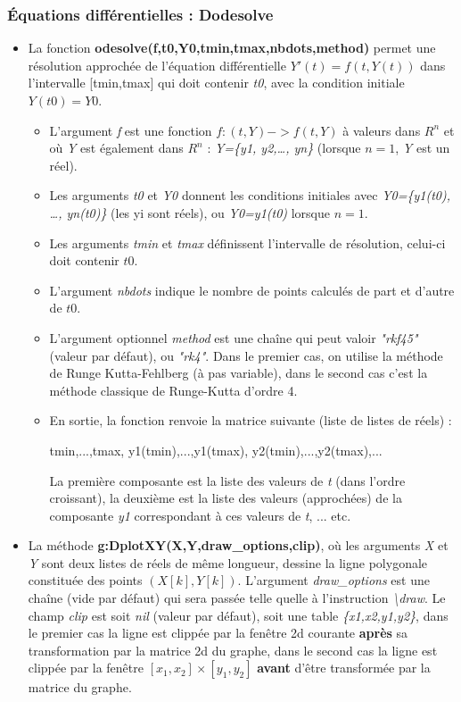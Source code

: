 \subsubsection{Équations différentielles : Dodesolve}

\begin{itemize}
\item La fonction \textbf{odesolve(f,t0,Y0,tmin,tmax,nbdots,method)} permet une résolution approchée de l'équation différentielle \(Y'(t)=f(t,Y(t))\) dans l'intervalle {[}tmin,tmax{]} qui doit contenir \emph{t0}, avec la condition initiale $Y(t0)=Y0$.

\begin{itemize}
  \item L'argument \emph{f} est une fonction \(f: (t,Y) -> f(t,Y)\) à valeurs dans \(R^n\) et où \emph{Y} est également dans \(R^n\) : \emph{Y=\{y1, y2,\ldots, yn\}} (lorsque $n=1$, \emph{Y} est un réel).
  \item Les arguments \emph{t0} et \emph{Y0} donnent les conditions initiales avec \emph{Y0=\{y1(t0), \ldots, yn(t0)\}} (les yi sont réels), ou \emph{Y0=y1(t0)} lorsque $n=1$.
  \item Les arguments \emph{tmin} et \emph{tmax} définissent l'intervalle de résolution, celui-ci doit contenir \(t0\).
  \item L'argument \emph{nbdots} indique le nombre de points calculés de part et d'autre de \(t0\).
  \item L'argument optionnel \emph{method} est une chaîne qui peut valoir \emph{"rkf45"} (valeur par défaut), ou \emph{"rk4"}. Dans le premier cas, on utilise la méthode de Runge Kutta-Fehlberg (à pas variable), dans le second cas c'est la méthode classique de Runge-Kutta d'ordre 4.
  \item En sortie, la fonction renvoie la matrice suivante (liste de listes de réels) :

\begin{TeXcode}
{ {tmin,...,tmax}, {y1(tmin),...,y1(tmax)}, {y2(tmin),...,y2(tmax)},...}
\end{TeXcode}

  La première composante est la liste des valeurs de \emph{t} (dans l'ordre croissant), la deuxième est la liste des valeurs (approchées) de la composante \emph{y1} correspondant à ces valeurs de \emph{t}, ... etc.
    \end{itemize}
    
\item La méthode \textbf{g:DplotXY(X,Y,draw\_options,clip)}, où les arguments \emph{X} et \emph{Y} sont deux listes de réels de même longueur, dessine la ligne polygonale constituée des points $(X[k],Y[k])$. L'argument \emph{draw\_options} est une chaîne (vide par défaut) qui sera passée telle quelle à l'instruction \emph{\textbackslash draw}. Le champ \emph{clip} est soit \emph{nil} (valeur par défaut), soit une table \emph{\{x1,x2,y1,y2\}}, dans le premier cas la ligne est clippée par la fenêtre 2d courante \textbf{après} sa transformation par la matrice 2d du graphe, dans le second cas la ligne est clippée par la fenêtre $[x_1,x_2]\times[y_1,y_2]$ \textbf{avant} d'être transformée par la matrice du graphe.



\end{itemize}
